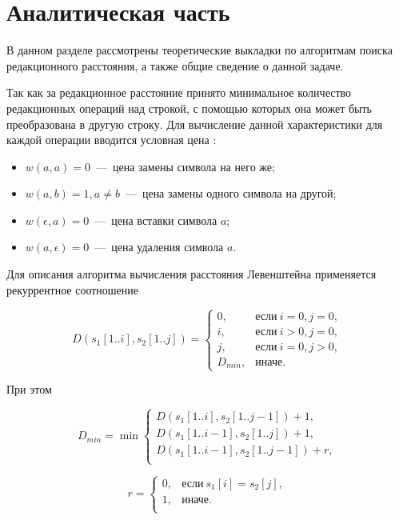 \chapter{Аналитическая часть}

В данном разделе рассмотрены теоретические выкладки по алгоритмам поиска редакционного расстояния, а также общие сведение о данной задаче.

Так как за редакционное расстояние принято минимальное количество редакционных операций над строкой, с помощью которых она может быть преобразована в другую строку. Для вычисление данной характеристики для каждой операции вводится условная цена \cite{bib:1}:

\begin{itemize}
	\item $w(a, a) = 0$~---~цена замены символа на него же;
	\item $w(a, b) = 1, a \ne b$~---~цена замены одного символа на другой;
	\item $w(\epsilon, a) = 0$~---~цена вставки символа $a$;
	\item $w(a, \epsilon) = 0$~---~цена удаления символа $a$.
\end{itemize}


Для описания алгоритма вычисления расстояния Левенштейна применяется рекуррентное соотношение

\begin{equation}
\label{eqn:levenshtein}
	D(s_1[1..i], s_2[1..j]) = \begin{cases}
      	0,& \text{если}\ i = 0, j = 0, \\ 
        i,& \text{если}\ i > 0, j = 0, \\ 
        j,& \text{если}\ i = 0, j > 0, \\
        D_{min},& \text{иначе}.
      \end{cases}
\end{equation}

При этом 

\begin{equation}
	D_{min} = \min \begin{cases}
		D(s_1[1..i], s_2[1..j - 1]) + 1, \\
		D(s_1[1..i - 1], s_2[1..j]) + 1, \\
		D(s_1[1..i - 1], s_2[1..j - 1]) + r, \\
	\end{cases}
\end{equation}

\begin{equation}
	r = \begin{cases}
      0, & \text{если}\ s_1[i] = s_2[j], \\
      1, & \text{иначе}. \\
      \end{cases}
\end{equation}

